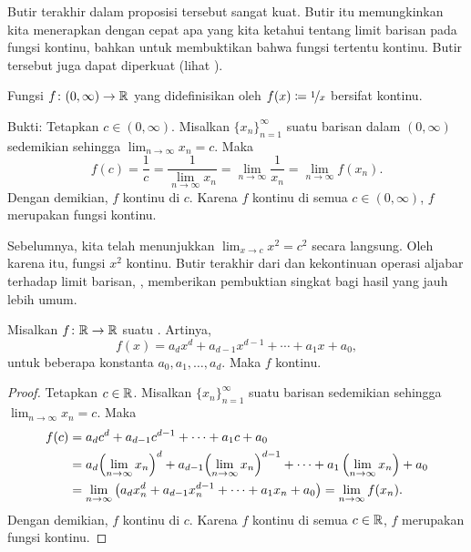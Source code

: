 Butir terakhir dalam proposisi tersebut sangat kuat.  Butir itu memungkinkan kita
menerapkan dengan cepat apa yang kita ketahui tentang limit barisan pada fungsi kontinu,
bahkan untuk membuktikan bahwa fungsi tertentu kontinu.
Butir tersebut juga dapat diperkuat (lihat ).

\begin{example}
Fungsi $f \colon (0,\infty) \to {\mathbb{R}}$
yang didefinisikan oleh $f(x) \coloneqq \nicefrac{1}{x}$ bersifat kontinu.

Bukti: Tetapkan $c \in (0,\infty)$.
Misalkan $\{ x_n \}_{n=1}^\infty$ suatu barisan dalam $(0,\infty)$ sedemikian sehingga
$\lim_{n\to\infty} x_n = c$.  Maka
\begin{equation*}
f(c) = \frac{1}{c}
=
\frac{1}{\lim_{n\to\infty} x_n}
=
\lim_{n \to \infty} \frac{1}{x_n}
=
\lim_{n \to \infty} f(x_n) .
\end{equation*}
Dengan demikian, $f$ kontinu di $c$.  Karena $f$ kontinu di semua $c \in
(0,\infty)$, $f$ merupakan fungsi kontinu.
\end{example}

Sebelumnya, kita telah menunjukkan $\lim_{x \to c} x^2 = c^2$ secara langsung.  Oleh karena itu,
fungsi $x^2$ kontinu.  Butir terakhir dari  dan kekontinuan
operasi aljabar terhadap limit barisan,
, memberikan pembuktian singkat bagi hasil yang jauh lebih umum.

\begin{prop}
Misalkan $f \colon {\mathbb{R}} \to {\mathbb{R}}$ suatu \emph{}.  Artinya,
\begin{equation*}
f(x) = a_d x^d + a_{d-1} x^{d-1} + \cdots + a_1 x + a_0 ,
\end{equation*}
untuk beberapa konstanta $a_0, a_1, \ldots, a_d$.
Maka $f$ kontinu.
\end{prop}

\begin{proof}
Tetapkan $c \in {\mathbb{R}}$.
Misalkan $\{ x_n \}_{n=1}^\infty$ suatu barisan sedemikian sehingga
$\lim_{n\to\infty} x_n = c$.  Maka
\begin{equation*}
\begin{split}
f(c) &=
a_d c^d + a_{d-1} c^{d-1} + \cdots + a_1 c + a_0 
\\
&= 
a_d {\left(\lim_{n\to\infty} x_n\right)}^d
+ a_{d-1} {\left(\lim_{n\to\infty} x_n\right)}^{d-1}
+ \cdots
+ a_1 \left(\lim_{n\to\infty} x_n\right) + a_0 
\\
& =
\lim_{n \to \infty}
\left(
a_d x_n^d + a_{d-1} x_n^{d-1} + \cdots + a_1 x_n + a_0 
\right)
=
\lim_{n \to \infty}
f(x_n) .
\avoidbreak
\end{split}
\end{equation*}
Dengan demikian, $f$ kontinu di $c$.  Karena $f$ kontinu di semua $c \in {\mathbb{R}}$,
$f$ merupakan fungsi kontinu.
\end{proof}

